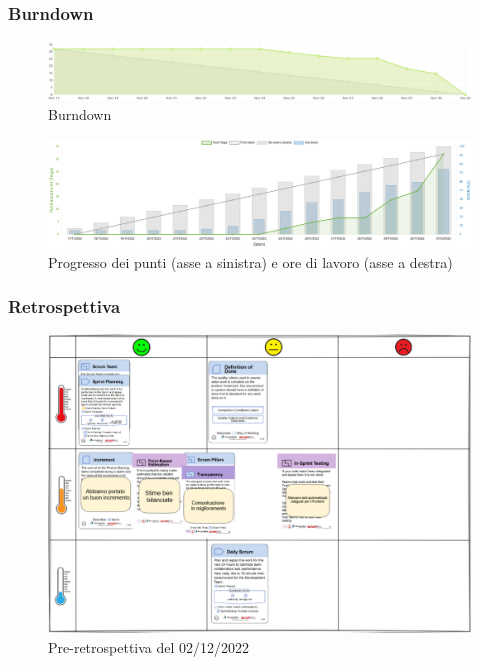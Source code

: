 \documentclass[11pt]{article}
\begin{document}
\subsubsection{Burndown}
\begin{figure}[H]
    \centering
    \includegraphics[width=15cm]{./img/sprint3/burndown.png}
    \caption{Burndown}
\end{figure}
\begin{figure}[H]
    \centering
    \includegraphics[width=15cm]{./img/sprint3/worktime.png}
    \caption{Progresso dei punti (asse a sinistra) e ore di lavoro (asse a destra)}
\end{figure}

\subsubsection{Retrospettiva}
\begin{figure}[H]
    \centering
    \includegraphics[width=15cm]{./img/sprint3/retrospettiva.png}
    \caption{Pre-retrospettiva del 02/12/2022}
\end{figure}
\end{document}
